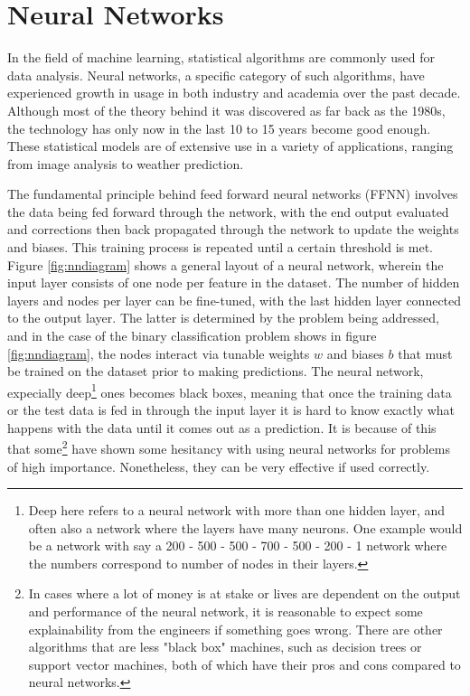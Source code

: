 \section{Neural Networks}
In the field of machine learning, statistical algorithms are commonly used for data analysis. 
Neural networks, a specific category of such algorithms, have experienced growth in 
usage in both industry and academia over the past decade. Although most of the theory behind it was 
discovered as far back as the 1980s, the technology has only now in the last 10 to 15 years become good enough. 
These statistical models are of extensive use in a variety of applications, ranging from image analysis to 
weather prediction. \par 
The fundamental principle behind feed forward neural networks (FFNN) involves the 
data being fed forward through the network, with the end output evaluated and corrections then back 
propagated through the network to update the weights and biases. This training process is repeated 
until a certain threshold is met. Figure \ref{fig:nndiagram} shows a general layout of a neural 
network, wherein the input layer consists of one node per feature in the dataset. The number of 
hidden layers and nodes per layer can be fine-tuned, with the last hidden layer connected to the 
output layer. The latter is determined by the problem being addressed, and in the case of the 
binary classification problem shows in figure \ref{fig:nndiagram}, the nodes interact via 
tunable weights $w$ and biases $b$ that must be trained on the dataset prior to making predictions.
The neural network, expecially deep\footnote{Deep here refers to a neural network with more than 
one hidden layer, and often also a network where the layers have many neurons. One example would be a network with say a 
200 - 500 - 500 - 700 - 500 - 200 - 1 network where the numbers correspond to number of nodes in their layers.} 
ones becomes black boxes, meaning that once the training data or the test data is fed in through 
the input layer it is hard to know exactly what happens with the data until it comes out as a 
prediction. It is because of this that some\footnote{In cases where a lot of money is at stake or 
lives are dependent on the output and performance of the neural network, it is reasonable to expect 
some explainability from the engineers if something goes wrong. There are other algorithms that are less 
"black box" machines, such as decision trees\cite{Chen_2016} or support vector machines\cite{cortes1995support}, 
both of which have their pros and cons compared to neural networks.} have shown some hesitancy 
with using neural networks for problems of high importance. Nonetheless, they can be very 
effective if used correctly. 

